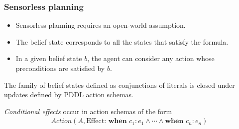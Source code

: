 \documentclass{article}
\begin{document}
\subsubsection{Sensorless planning}

\begin{itemize}
    \item Sensorless planning requires an open-world assumption.
    \item The belief state corresponds to all the states that satisfy the formula.
    \item In a given belief state $b$, the agent can consider any action whose preconditions are satisfied by $b$.
\end{itemize}

\begin{theorem}
    The family of belief states defined as conjunctions of literals is closed under updates defined by PDDL
    action schemas.
\end{theorem}

\begin{definition}
    \emph{Conditional effects} occur in action schemas of the form
    \begin{align*}
        Action(A,
              \text{Effect:}\textbf{ when }c_1: e_1 \wedge \cdots \wedge \textbf{when }c_n: e_n)
    \end{align*}
\end{definition}
\end{document}
